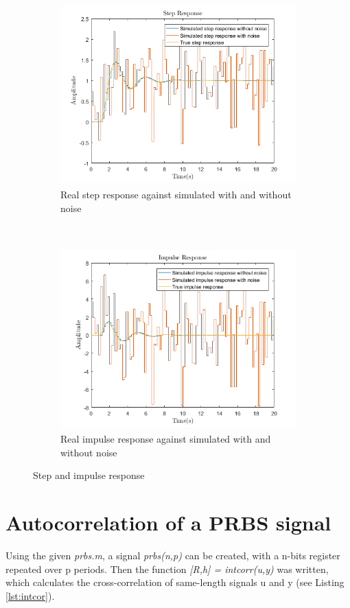 \documentclass[a4paper,11pt]{article}
\begin{document}
\begin{figure}[H]
\centering
    \begin{subfigure}[t]{0.5\textwidth}
        \centering
        \includegraphics[height=7cm]{images/step_wo_noise} 
        \caption{Real step response against simulated with and without noise}
        \label{fig:step_noise}
    \end{subfigure}
    ~
    \begin{subfigure}[t]{0.5\textwidth}
        \centering
        \includegraphics[height=7cm]{images/impulse_wo_noise} 
        \caption{Real impulse response against simulated with and without noise}
		\label{fig:impulse_noise}
    \end{subfigure} 
\caption{Step and impulse response }
\label{fig:responses_noise}
\end{figure}




\section{Autocorrelation of a PRBS signal}

Using the given \textit{prbs.m}, a signal \textit{prbs(n,p)} can be created, with a n-bits register repeated over p periods. Then the function \textit{[R,h] = intcorr(u,y)} was written, which calculates the cross-correlation of same-length signals u and y (see Listing \ref{lst:intcor}). 
\end{document}
